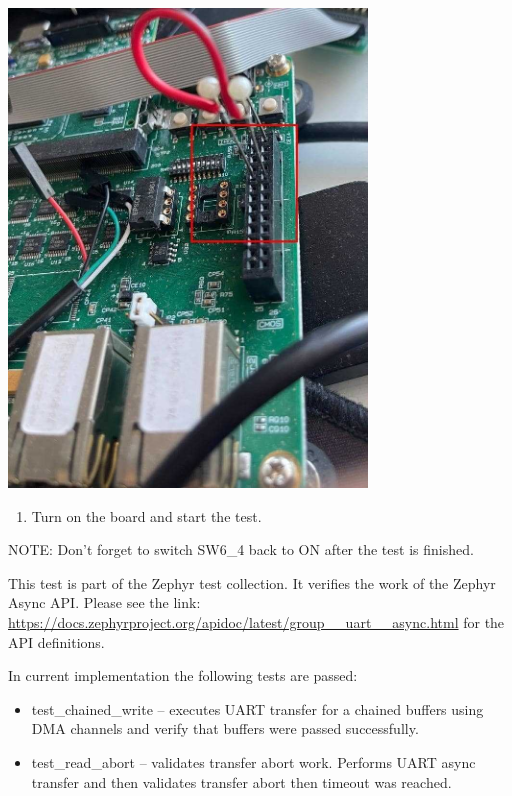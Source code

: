 \documentclass[11pt,a4paper,oneside]{article}
\begin{document}
\includegraphics[width=3.75in,height=5in]{./media/image31.jpg}

\begin{enumerate}
\def\labelenumi{\arabic{enumi})}
\setcounter{enumi}{3}
\item
  Turn on the board and start the test.
\end{enumerate}

NOTE: Don't forget to switch SW6\_4 back to ON after the test is
finished.

This test is part of the Zephyr test collection. It verifies the work of
the Zephyr Async API. Please see the link:
\url{https://docs.zephyrproject.org/apidoc/latest/group__uart__async.html}
for the API definitions.

In current implementation the following tests are passed:

\begin{itemize}
\item
  test\_chained\_write -- executes UART transfer for a chained buffers
  using DMA channels and verify that buffers were passed successfully.
\end{itemize}

\begin{itemize}
\item
  test\_read\_abort -- validates transfer abort work. Performs UART
  async transfer and then validates transfer abort then timeout was
  reached.
\end{itemize}
\end{document}
